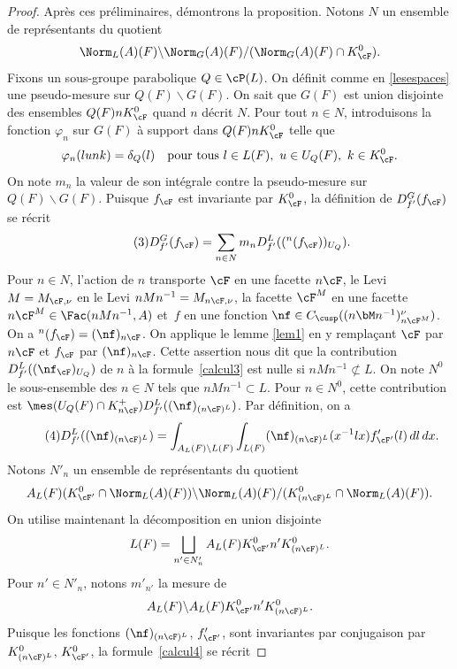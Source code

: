 \begin{proof}
Après ces préliminaires, démontrons la proposition. Notons $N$ un ensemble de représentants du quotient
\[
\Norm_{L}(A)(F)\backslash \Norm_{G}(A)(F)/(\Norm_{G}(A)(F)\cap K_{\cF}^0).
\]
Fixons un sous-groupe parabolique $Q \in \cP(L)$. On définit comme en \ref{lesespaces} une pseudo-mesure sur $Q(F)\backslash G(F)$. On sait que $G(F)$ est union disjointe des ensembles $Q(F)nK_{\cF}^0$ quand $n$ décrit $N$. Pour tout $n\in N$, introduisons la fonction $\varphi_{n}$ sur $G(F)$ à support dans $Q(F)nK_{\cF}^0$ telle que
\[
\varphi_{n}(lunk)=\delta_{Q}(l)\quad\text{pour tous } l\in L(F),\ u\in U_{Q}(F),\ k\in K_{\cF}^0.
\]
On note $m_{n}$ la valeur de son intégrale contre la pseudo-mesure sur $Q(F)\backslash G(F)$.
Puisque $f_{\cF}$ est invariante par $K_{\cF}^0$, la définition de $D^G_{f'}(f_{\cF})$ se récrit
\begin{equation}\tag{3}\label{calcul3}
D^G_{f'}(f_{\cF})= \sum_{n\in N}m_{n}D_{f'}^L((^n(f_{\cF}))_{U_{Q}}).
\end{equation}
Pour $n\in N$, l'action de $n$ transporte $\cF$ en une facette $n\cF$, le Levi $M=M_{\cF,\nu}$ en le Levi $nMn^{-1}=M_{n\cF,\nu}$, la facette $\cF^M$ en une facette $n\cF^M\in \Fac(nMn^{-1},A)$ et~$f$ en une fonction $\nf\in C_{\cusp}(({n\bM n^{-1}})_{n\cF^M}^{\nu})$. On a $^n(f_{\cF})=(\nf)_{n\cF}$. On applique le lemme \ref{lem1} en y remplaçant $\cF$ par $n\cF$ et $f_{\cF}$ par $(\nf)_{n\cF}$. Cette assertion nous dit que la contribution $D_{f'}^L((\nf_{\cF})_{U_{Q}})$ de $n$ à la formule~\eqref{calcul3} est nulle si $nMn^{-1}\not\subset L$. On note $N^0$ le sous-ensemble des $n\in N$ tels que $nMn^{-1}\subset L$. Pour $n\in N^0$, cette contribution est $\mes(U_{Q}(F)\cap K_{n\cF}^+)D_{f'}^L((\nf)_{(n\cF)^L})$. Par définition, on a
\begin{equation}\tag{4}\label{calcul4}
D_{f'}^L((\nf)_{(n\cF)^L})=\int_{A_{L}(F)\backslash L(F)} \int_{L(F)}(\nf)_{(n\cF)^L}(x^{-1}lx)f'_{\cF'}(l)\,dl\,dx.
\end{equation}
Notons $ N'_{n}$ un ensemble de représentants du quotient
\[
A_{L}(F)(K_{\cF'}^0\cap \Norm_{L}(A)(F))\backslash \Norm_{L}(A)(F)/(K_{(n\cF)^L}^0\cap \Norm_{L}(A)(F)).
\]
On utilise maintenant la décomposition en union disjointe
\[
L(F)=\bigsqcup_{n'\in N'_{n}} A_{L}(F)K_{\cF'}^0n'K_{(n\cF)^L}^0.
\]
Pour $n'\in N'_{n}$, notons $m'_{n'}$ la mesure de
\[
A_{L}(F)\backslash A_{L}(F)K_{\cF'}^0n'K_{(n\cF)^L}^0.
\]
Puisque les fonctions $(\nf)_{(n\cF)^L}$, \resp $f'_{\cF'}$, sont invariantes par conjugaison par $K_{(n\cF)^L}^0$, \resp $K_{\cF'}^0$, la formule~\eqref{calcul4} se récrit

\end{proof}
